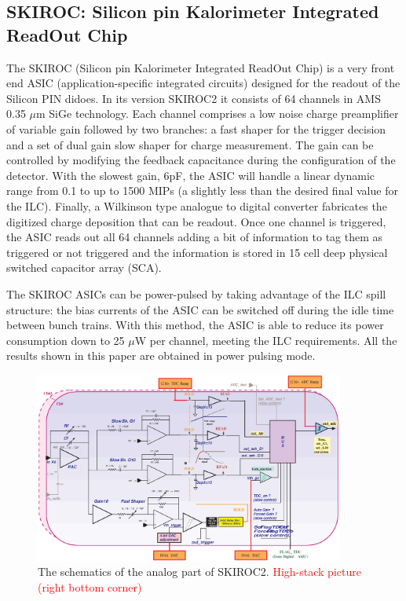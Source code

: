 \documentclass[a4paper,11pt]{article}
\newcommand{\todo}[1]{\textcolor{red}{{#1}}}
\begin{document}

\subsection{SKIROC: Silicon pin Kalorimeter Integrated ReadOut Chip}
\label{sec:skiroc}

The SKIROC\cite{Callier:2011zz} (Silicon pin Kalorimeter Integrated ReadOut Chip) is a
very front end ASIC (application-specific integrated circuits)
designed for the readout of the Silicon PIN didoes.
In its version SKIROC2 it consists of 64 channels in AMS 0.35 $\mu$m SiGe technology.
Each channel comprises a low noise charge preamplifier of variable gain followed by two branches:
a fast shaper for the trigger decision and a set of dual gain slow shaper for charge measurement. 
The gain can be controlled by modifying the feedback capacitance during the configuration of the detector.
With the slowest gain, 6pF, the ASIC will handle a linear dynamic range from 0.1 to up to 1500 MIPs 
(a slightly less than the desired final value for the ILC). 
Finally, a Wilkinson type analogue to digital converter fabricates the digitized charge deposition that can be readout. 
Once one channel is triggered, the ASIC reads out all 64 channels adding a bit of information to tag them as
triggered or not triggered and the information is stored in 15 cell deep physical switched capacitor array (SCA).

The SKIROC ASICs can be power-pulsed by taking advantage of the ILC spill structure: 
the bias currents of the ASIC can be switched off during the idle time between bunch trains.
With this method, the ASIC is able to reduce its power consumption down to 25 $\mu$W per channel,
meeting the ILC requirements. All the results shown in this paper are obtained in power pulsing mode.

\begin{figure}[!t]
  \centering
    \includegraphics[width=4in]{../figs/skiroc2_block.eps}
\caption{The schematics of the analog part of SKIROC2. \todo{High-stack picture (right bottom corner)}}
\label{SKIROC2}
\end{figure}
\end{document}
